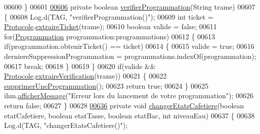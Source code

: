 \begin{DoxyCode}
00600     \}
00601 
\hyperlink{classcom_1_1example_1_1ekawa_1_1_cafetiere_ac3f2b337d1fd091faa312c2c6ec08bfc}{00606}     \textcolor{keyword}{private} \textcolor{keywordtype}{boolean} \hyperlink{classcom_1_1example_1_1ekawa_1_1_cafetiere_ac3f2b337d1fd091faa312c2c6ec08bfc}{verifierProgrammation}(String trame)
00607     \{
00608         Log.d(TAG, \textcolor{stringliteral}{"verifierProgrammation()"});
00609         \textcolor{keywordtype}{int} ticket = \hyperlink{classcom_1_1example_1_1ekawa_1_1_protocole}{Protocole}.\hyperlink{classcom_1_1example_1_1ekawa_1_1_protocole_a4997ef198a7f87d76c2f68849caae8d7}{extraireTicket}(trame);
00610         \textcolor{keywordtype}{boolean} valide = \textcolor{keyword}{false};
00611         \textcolor{keywordflow}{for}(\hyperlink{classcom_1_1example_1_1ekawa_1_1_programmation}{Programmation} programmation:programmations)
00612         \{
00613             \textcolor{keywordflow}{if}(programmation.obtenirTicket() == ticket)
00614             \{
00615                 valide = \textcolor{keyword}{true};
00616                 derniereSuppressionProgrammation = programmations.indexOf(programmation);
00617                 \textcolor{keywordflow}{break};
00618             \}
00619         \}
00620         \textcolor{keywordflow}{if}(valide && \hyperlink{classcom_1_1example_1_1ekawa_1_1_protocole}{Protocole}.\hyperlink{classcom_1_1example_1_1ekawa_1_1_protocole_add9d5727209d29af21fa468e6929fe0b}{extraireVerification}(trame))
00621         \{
00622             \hyperlink{classcom_1_1example_1_1ekawa_1_1_cafetiere_a40880363bf27354c1a7cb5df139fae53}{supprimerUneProgrammation}();
00623             \textcolor{keywordflow}{return} \textcolor{keyword}{true};
00624         \}
00625         ihm.\hyperlink{classcom_1_1example_1_1ekawa_1_1_ihm_ab1ca33ad18d42540299e3a58a82f4d9a}{afficherMessage}(\textcolor{stringliteral}{"Erreur lors du lancement de votre programmation"});
00626         \textcolor{keywordflow}{return} \textcolor{keyword}{false};
00627     \}
00628 
\hyperlink{classcom_1_1example_1_1ekawa_1_1_cafetiere_a6fa4b1560875b71d339a9f6c24c5336d}{00636}     \textcolor{keyword}{private} \textcolor{keywordtype}{void} \hyperlink{classcom_1_1example_1_1ekawa_1_1_cafetiere_a6fa4b1560875b71d339a9f6c24c5336d}{changerEtatsCafetiere}(\textcolor{keywordtype}{boolean} etatCafetiere, \textcolor{keywordtype}{boolean} etatTasse, \textcolor{keywordtype}{
      boolean} etatBac, \textcolor{keywordtype}{int} niveauEau)
00637     \{
00638         Log.d(TAG, \textcolor{stringliteral}{"changerEtatsCafetiere()"});

\end{DoxyCode}
